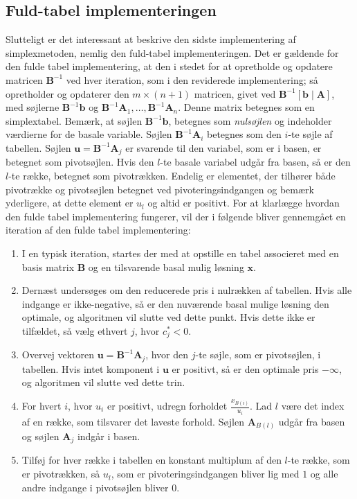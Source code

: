 \subsection{Fuld-tabel implementeringen}
Slutteligt er det interessant at beskrive den sidste implementering af simplexmetoden, nemlig den fuld-tabel implementeringen. 
Det er gældende for den fulde tabel implementering, at den i stedet for at opretholde og opdatere matricen $\mathbf{B}^{-1}$ ved hver iteration, som i den reviderede implementering; så opretholder og opdaterer den $m \times (n+1)$ matricen, givet ved $\mathbf{B}^{-1} \left [ \mathbf{b} \mid \mathbf{A} \right ]$, med søjlerne $\mathbf{B}^{-1}\mathbf{b}$ og $\mathbf{B}^{-1}\mathbf{A}_1,\ldots,\mathbf{B}^{-1}\mathbf{A}_n$. 
Denne matrix betegnes som en simplextabel. Bemærk, at søjlen $\mathbf{B}^{-1}\mathbf{b}$, betegnes som \textit{nulsøjlen} og indeholder værdierne for de basale variable. 
Søjlen $\mathbf{B}^{-1}\mathbf{A}_i$ betegnes som den $i$-te søjle af tabellen. Søjlen $\mathbf{u} = \mathbf{B}^{-1}\mathbf{A}_j$ er svarende til den variabel, som er i basen, er betegnet som pivotsøjlen. 
Hvis den $l$-te basale variabel udgår fra basen, så er den $l$-te række, betegnet som pivotrækken. 
Endelig er elementet, der tilhører både pivotrække og pivotsøjlen betegnet ved pivoteringsindgangen og bemærk yderligere, at dette element er $u_l$ og altid er positivt. 
For at klarlægge hvordan den fulde tabel implementering fungerer, vil der i følgende bliver gennemgået en iteration af den fulde tabel implementering: 
%
\begin{col}{}{}
\begin{enumerate}
\item I en typisk iteration, startes der med at opstille en tabel associeret med en basis matrix $\mathbf{B}$ og en tilsvarende basal mulig løsning $\mathbf{x}.$
\item Dernæst undersøges om den reducerede pris i nulrækken af tabellen. Hvis alle indgange er ikke-negative, så er den nuværende basal mulige løsning den optimale, og algoritmen vil slutte ved dette punkt. Hvis dette ikke er tilfældet, så vælg ethvert $j$, hvor $c_j^* < 0$.
\item Overvej vektoren $\mathbf{u}=\mathbf{B}^{-1}\mathbf{A}_j$, hvor den $j$-te søjle, som er pivotsøjlen, i tabellen. Hvis intet komponent i $\mathbf{u}$ er positivt, så er den optimale pris $-\infty$, og algoritmen vil slutte ved dette trin. 
\item For hvert $i$, hvor $u_i$ er positivt, udregn forholdet $\frac{x_{B(i)}}{u_i}$. Lad $l$ være det index  af en række, som tilsvarer det laveste forhold. Søjlen $\mathbf{A}_{B(l)}$ udgår fra basen og søjlen $\mathbf{A}_j$ indgår i basen. 
\item Tilføj for hver række i tabellen en konstant multiplum af den $l$-te række, som er pivotrækken, så $u_l$, som er pivoteringsindgangen bliver lig med $1$ og alle andre indgange i pivotsøjlen bliver 0. 
\end{enumerate}
\end{col}
\noindent
%